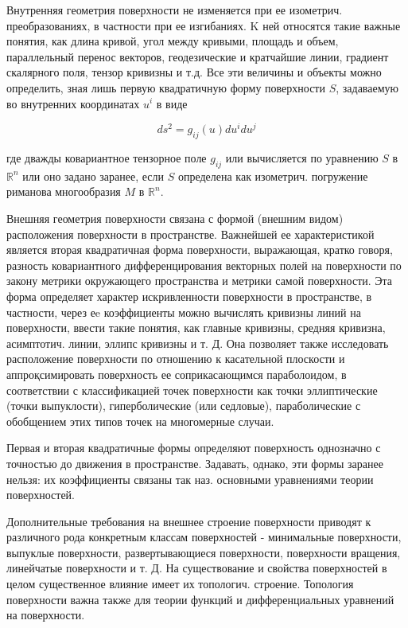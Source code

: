\documentclass[10pt]{article}
\begin{document}
Внутренняя геометрия поверхности не изменяется при ее изометрич. преобразованиях, в частности при ее изгибаниях. K ней относятся такие важные понятия, как длина кривой, угол между кривыми, площадь и объем, параллельный перенос векторов, геодезические и кратчайшие линии, градиент скалярного поля, тензор кривизны и т.д. Все эти величины и объекты можно определить, зная лишь первую квадратичную форму поверхности $S$, задаваемую во внутренних координатах $u^{i}$ в виде



\[

d s^{2}=g_{i j}(u) d u^{i} d u^{j}

\]



где дважды ковариантное тензорное поле $g_{i j}$ или вычисляется по уравнению $S$ в $\mathbb{R}^{n}$ или оно задано заранее, если $S$ определена как изометрич. погружение риманова многообразия $M$ в $\mathbb{R}^{n}$.



Внешняя геометрия поверхности связана с формой (внешним видом) расположения поверхности в пространстве. Важнейшей ее характеристикой является вторая квадратичная форма поверхности, выражающая, кратко говоря, разность ковариантного дифференцирования векторных полей на поверхности по закону метрики окружающего пространства и метрики самой поверхности. Эта форма определяет характер искривленности поверхности в пространстве, в частности, через еe коэффициенты можно вычислять кривизны линий на поверхности, ввести такие понятия, как главные кривизны, средняя кривизна, асимптотич. линии, эллипс кривизны и т. Д. Она позволяет также исследовать расположение поверхности по отношению к касательной плоскости и аппроқсимировать поверхность ее соприкасающимся параболоидом, в соответствии с классификацией точек поверхности как точки эллиптические (точки выпуклости), гиперболические (или седловые), параболические с обобщением этих типов точек на многомерные случаи.



Первая и вторая квадратичные формы определяют поверхность однозначно с точностью до движения в пространстве. Задавать, однако, эти формы заранее нельзя: их коэффициенты связаны так наз. основными уравнениями теории поверхностей.



Дополнительные требования на внешнее строение поверхности приводят к различного рода конкретным классам поверхностей - минимальные поверхности, выпуклые поверхности, развертывающиеся поверхности, поверхности вращения, линейчатые поверхности и т. Д. На существование и свойства поверхностей в целом существенное влияние имеет их топологич. строение. Топология поверхности важна также для теории функций и дифференциальных уравнений на поверхности.
\end{document}
